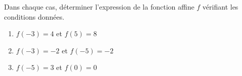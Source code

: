 \begin{exo}{}
	Dans chaque cas, déterminer l'expression de la fonction affine $f$ vérifiant les conditions données.
	\begin{enumerate}
		\item $f(-3) = 4$ et $f(5) = 8$
		\item $f(-3) = -2$ et $f(-5) = -2$
		\item $f(-5) = 3$ et $f(0) = 0$
	\end{enumerate}
\end{exo}
